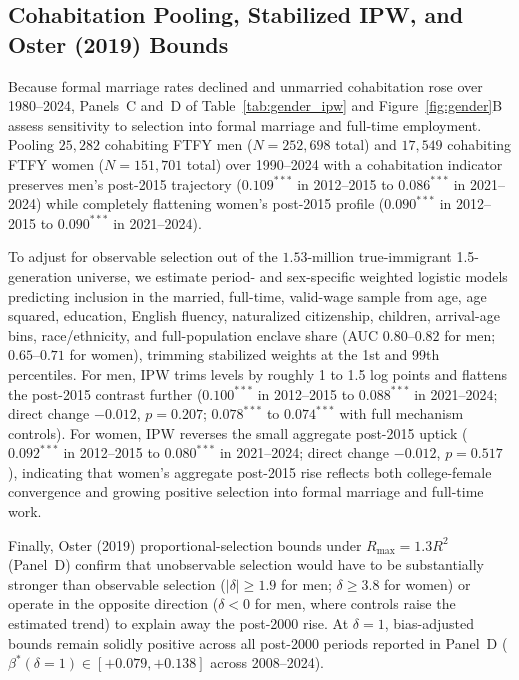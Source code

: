 \documentclass[11pt]{article}
\begin{document}
\subsection{Cohabitation Pooling, Stabilized IPW, and Oster (2019) Bounds}
Because formal marriage rates declined and unmarried cohabitation rose over 1980--2024, Panels~C and~D of Table~\ref{tab:gender_ipw} and Figure~\ref{fig:gender}B assess sensitivity to selection into formal marriage and full-time employment. Pooling $25{,}282$ cohabiting FTFY men ($N = 252{,}698$ total) and $17{,}549$ cohabiting FTFY women ($N = 151{,}701$ total) over 1990--2024 with a cohabitation indicator preserves men's post-2015 trajectory ($0.109^{***}$ in 2012--2015 to $0.086^{***}$ in 2021--2024) while completely flattening women's post-2015 profile ($0.090^{***}$ in 2012--2015 to $0.090^{***}$ in 2021--2024).

To adjust for observable selection out of the $1.53$-million true-immigrant 1.5-generation universe, we estimate period- and sex-specific weighted logistic models predicting inclusion in the married, full-time, valid-wage sample from age, age squared, education, English fluency, naturalized citizenship, children, arrival-age bins, race/ethnicity, and full-population enclave share (AUC $0.80$--$0.82$ for men; $0.65$--$0.71$ for women), trimming stabilized weights at the 1st and 99th percentiles. For men, IPW trims levels by roughly 1 to 1.5 log points and flattens the post-2015 contrast further ($0.100^{***}$ in 2012--2015 to $0.088^{***}$ in 2021--2024; direct change $-0.012$, $p = 0.207$; $0.078^{***}$ to $0.074^{***}$ with full mechanism controls). For women, IPW reverses the small aggregate post-2015 uptick ($0.092^{***}$ in 2012--2015 to $0.080^{***}$ in 2021--2024; direct change $-0.012$, $p = 0.517$), indicating that women's aggregate post-2015 rise reflects both college-female convergence and growing positive selection into formal marriage and full-time work.

Finally, Oster (2019) proportional-selection bounds under $R_{\max} = 1.3 R^2$ (Panel~D) confirm that unobservable selection would have to be substantially stronger than observable selection ($|\delta| \ge 1.9$ for men; $\delta \ge 3.8$ for women) or operate in the opposite direction ($\delta < 0$ for men, where controls raise the estimated trend) to explain away the post-2000 rise. At $\delta = 1$, bias-adjusted bounds remain solidly positive across all post-2000 periods reported in Panel~D ($\beta^{*}(\delta=1) \in [+0.079, +0.138]$ across 2008--2024).
\end{document}
